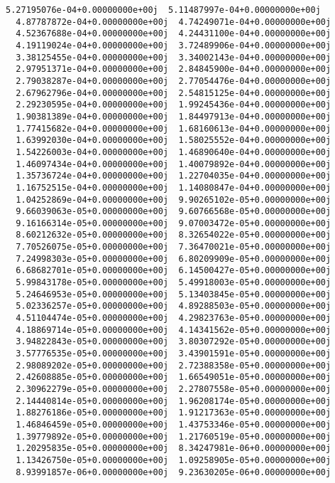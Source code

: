 \documentclass[11pt]{article}
\begin{document}
\begin{Verbatim}[commandchars=\\\{\}]
  5.27195076e-04+0.00000000e+00j  5.11487997e-04+0.00000000e+00j
  4.87787872e-04+0.00000000e+00j  4.74249071e-04+0.00000000e+00j
  4.52367688e-04+0.00000000e+00j  4.24431100e-04+0.00000000e+00j
  4.19119024e-04+0.00000000e+00j  3.72489906e-04+0.00000000e+00j
  3.38125455e-04+0.00000000e+00j  3.34002143e-04+0.00000000e+00j
  2.97951371e-04+0.00000000e+00j  2.84845900e-04+0.00000000e+00j
  2.79038287e-04+0.00000000e+00j  2.77054476e-04+0.00000000e+00j
  2.67962796e-04+0.00000000e+00j  2.54815125e-04+0.00000000e+00j
  2.29230595e-04+0.00000000e+00j  1.99245436e-04+0.00000000e+00j
  1.90381389e-04+0.00000000e+00j  1.84497913e-04+0.00000000e+00j
  1.77415682e-04+0.00000000e+00j  1.68160613e-04+0.00000000e+00j
  1.63992030e-04+0.00000000e+00j  1.58025552e-04+0.00000000e+00j
  1.54226003e-04+0.00000000e+00j  1.46890640e-04+0.00000000e+00j
  1.46097434e-04+0.00000000e+00j  1.40079892e-04+0.00000000e+00j
  1.35736724e-04+0.00000000e+00j  1.22704035e-04+0.00000000e+00j
  1.16752515e-04+0.00000000e+00j  1.14080847e-04+0.00000000e+00j
  1.04252869e-04+0.00000000e+00j  9.90265102e-05+0.00000000e+00j
  9.66039063e-05+0.00000000e+00j  9.60766568e-05+0.00000000e+00j
  9.16166314e-05+0.00000000e+00j  9.07003472e-05+0.00000000e+00j
  8.60212632e-05+0.00000000e+00j  8.32654022e-05+0.00000000e+00j
  7.70526075e-05+0.00000000e+00j  7.36470021e-05+0.00000000e+00j
  7.24998303e-05+0.00000000e+00j  6.80209909e-05+0.00000000e+00j
  6.68682701e-05+0.00000000e+00j  6.14500427e-05+0.00000000e+00j
  5.99843178e-05+0.00000000e+00j  5.49918003e-05+0.00000000e+00j
  5.24646953e-05+0.00000000e+00j  5.13403845e-05+0.00000000e+00j
  5.02336257e-05+0.00000000e+00j  4.89288503e-05+0.00000000e+00j
  4.51104474e-05+0.00000000e+00j  4.29823763e-05+0.00000000e+00j
  4.18869714e-05+0.00000000e+00j  4.14341562e-05+0.00000000e+00j
  3.94822843e-05+0.00000000e+00j  3.80307292e-05+0.00000000e+00j
  3.57776535e-05+0.00000000e+00j  3.43901591e-05+0.00000000e+00j
  2.98089202e-05+0.00000000e+00j  2.72388358e-05+0.00000000e+00j
  2.42608885e-05+0.00000000e+00j  1.66549051e-05+0.00000000e+00j
  2.30962279e-05+0.00000000e+00j  2.27807558e-05+0.00000000e+00j
  2.14440814e-05+0.00000000e+00j  1.96208174e-05+0.00000000e+00j
  1.88276186e-05+0.00000000e+00j  1.91217363e-05+0.00000000e+00j
  1.46846459e-05+0.00000000e+00j  1.43753346e-05+0.00000000e+00j
  1.39779892e-05+0.00000000e+00j  1.21760519e-05+0.00000000e+00j
  1.20295835e-05+0.00000000e+00j  8.34247981e-06+0.00000000e+00j
  1.13426750e-05+0.00000000e+00j  1.09258905e-05+0.00000000e+00j
  8.93991857e-06+0.00000000e+00j  9.23630205e-06+0.00000000e+00j

\end{Verbatim}
\end{document}

